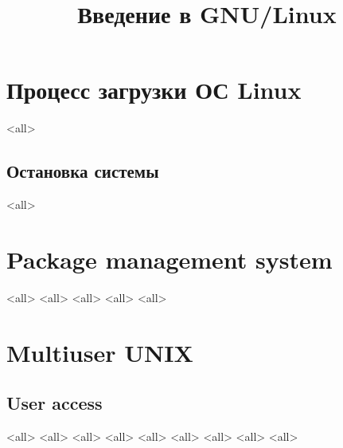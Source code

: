 

\title{Введение в GNU/Linux}





\begin{frame}
	\frametitle{}
	\titlepage
	\vspace{-0.5cm}
	\begin{center}
	\end{center}
\end{frame}



\section{Процесс загрузки ОС Linux}
\mode<all>{}
\subsection{Остановка системы}
\mode<all>{}

\section{Package management system}
\mode<all>{}
\mode<all>{}
\mode<all>{}
\mode<all>{}
\mode<all>{}

\section{Multiuser UNIX}
\subsection{User access}
\mode<all>{}
\mode<all>{}
\mode<all>{}
\mode<all>{}
\mode<all>{}
\mode<all>{}
\mode<all>{}
\mode<all>{}
\mode<all>{}
